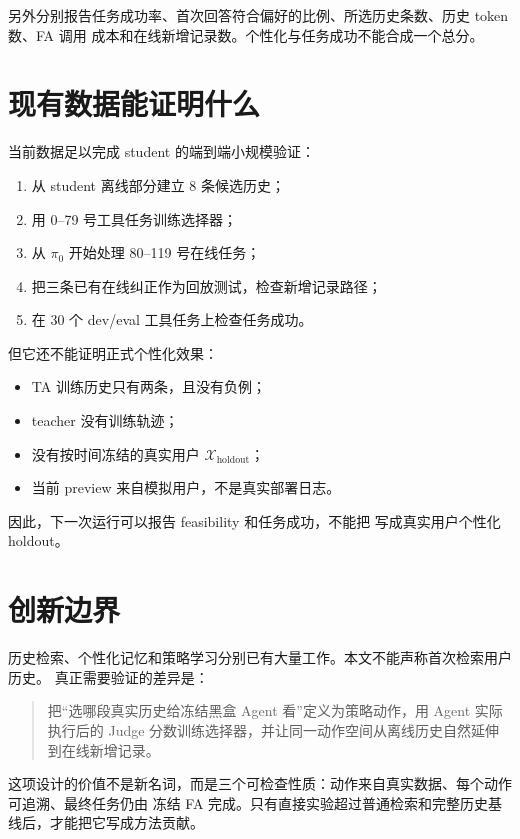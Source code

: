 \documentclass[11pt,UTF8,fontset=none]{ctexart}
\newcommand{\Xholdout}{\mathcal X_{\mathrm{holdout}}}
\begin{document}
另外分别报告任务成功率、首次回答符合偏好的比例、所选历史条数、历史 token 数、FA 调用
成本和在线新增记录数。个性化与任务成功不能合成一个总分。

\section{现有数据能证明什么}

当前数据足以完成 student 的端到端小规模验证：
\begin{enumerate}
  \item 从 student 离线部分建立 8 条候选历史；
  \item 用 0--79 号工具任务训练选择器；
  \item 从 \(\pi_0\) 开始处理 80--119 号在线任务；
  \item 把三条已有在线纠正作为回放测试，检查新增记录路径；
  \item 在 30 个 dev/eval 工具任务上检查任务成功。
\end{enumerate}

但它还不能证明正式个性化效果：
\begin{itemize}
  \item TA 训练历史只有两条，且没有负例；
  \item teacher 没有训练轨迹；
  \item 没有按时间冻结的真实用户 \(\Xholdout\)；
  \item 当前 preview 来自模拟用户，不是真实部署日志。
\end{itemize}

因此，下一次运行可以报告 feasibility 和任务成功，不能把
 写成真实用户个性化 holdout。

\section{创新边界}

历史检索、个性化记忆和策略学习分别已有大量工作。本文不能声称首次检索用户历史。
真正需要验证的差异是：
\begin{quote}
把``选哪段真实历史给冻结黑盒 Agent 看''定义为策略动作，用 Agent 实际执行后的 Judge
分数训练选择器，并让同一动作空间从离线历史自然延伸到在线新增记录。
\end{quote}

这项设计的价值不是新名词，而是三个可检查性质：动作来自真实数据、每个动作可追溯、最终任务仍由
冻结 FA 完成。只有直接实验超过普通检索和完整历史基线后，才能把它写成方法贡献。
\end{document}
